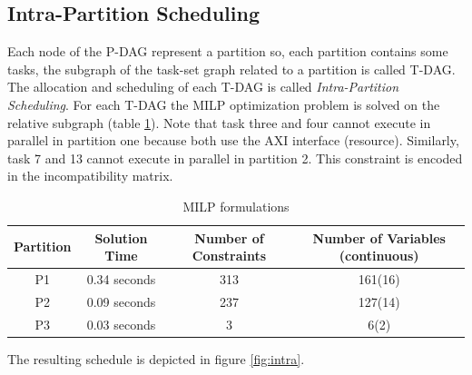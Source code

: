 
\subsection{Intra-Partition Scheduling}
Each node of the P-DAG represent a partition so, each partition contains some tasks, the subgraph of the task-set graph related to a partition is called T-DAG. %
The allocation and scheduling of each T-DAG is called \emph{Intra-Partition Scheduling}. For each T-DAG the MILP optimization problem is solved on the relative subgraph (table \ref{tab:milp}). Note that task three and four cannot execute in parallel in partition one because both use the AXI interface (resource). Similarly, task 7 and 13 cannot execute in parallel in partition 2. This constraint is encoded in the incompatibility matrix.
\begin{table}
\begin{center}
\begin{tabular}{cccc}  
\toprule
Partition & Solution Time & Number of Constraints & Number of Variables (continuous) \\
\midrule
P1  & 0.34 seconds & 313 & 161(16)\\
P2  & 0.09 seconds & 237 & 127(14)\\
P3  & 0.03 seconds & 3 	 & 6(2)\\
\bottomrule
\end{tabular}
\caption {MILP formulations}
\label{tab:milp}
\end{center}
\end{table}
The resulting schedule is depicted in figure \ref{fig:intra}.

